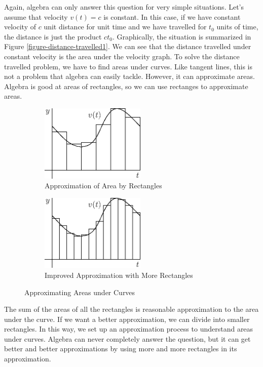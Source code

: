 \documentclass[fleqn]{report}
\begin{document}
Again, algebra can only answer this
question for very simple situations. Let's assume that
velocity $v(t) = c$ is constant. In this case, if we have
constant velocity of $c$ unit distance for unit time and we
have travelled for $t_0$ units of time, the distance is just the
product $ct_0$. Graphically, the situation is summarized in 
Figure \ref{figure-distance-travelled1}. We can see that the distance
travelled under constant velocity is the area under the
velocity graph.  To solve the distance travelled problem, we
have to find areas under curves. Like tangent lines, this is
not a problem that algebra can easily tackle. However, it can
approximate areas. Algebra is good at areas of rectangles, so
we can use rectanges to approximate areas.

\begin{figure}[bt]
\centering
\begin{subfigure}{.5\textwidth}
 \centering
 \includegraphics[width=5cm]{figure16.eps}
 \caption{Approximation of Area by Rectangles}
\end{subfigure}%
\begin{subfigure}{.5\textwidth}
 \centering
 \includegraphics[width=5cm]{figure17.eps}
 \caption{Improved Approximation with More Rectangles}
\end{subfigure}
\caption{Approximating Areas under Curves}
\label{figure-approximating-areas1}
\end{figure}

The sum of the areas of all the rectangles is reasonable
approximation to the area under the curve. If we want a
better approximation, we can divide into smaller rectangles.
In this way, we set up an approximation process to understand
areas under curves. Algebra can never completely answer the
question, but it can get better and better approximations by
using more and more rectangles in its approximation.
\end{document}
